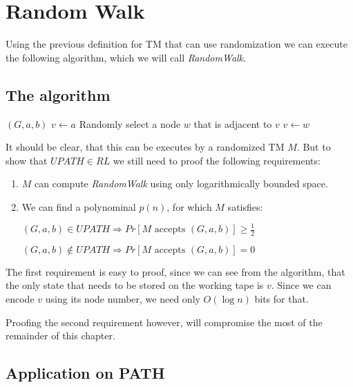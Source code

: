 \chapter{Random Walk}\label{random-walk}

Using the previous definition for TM that can use randomization we can
execute the following algorithm, which we will call \emph{RandomWalk}.

\section{The algorithm}\label{the-algorithm}

\renewcommand{\algorithmicrequire}{\textbf{Input:}}
\renewcommand{\algorithmicensure}{\textbf{Output:}}

\begin{algorithmic}
\Require $(G, a, b)$
\State $v \gets a$
    \State Randomly select a node $w$ that is adjacent to $v$
    \State $v \gets w$
    \EndIf
\EndFor
{}
\end{algorithmic}

It should be clear, that this can be executes by a randomized TM $M$.
But to show that $UPATH \in RL$ we still need to proof the following
requirements:

\begin{enumerate}
\def\labelenumi{\arabic{enumi}.}
\item
  $M$ can compute \emph{RandomWalk} using only logarithmically bounded
  space.
\item
  We can find a polynominal $p(n)$, for which $M$ satisfies:

  $(G, a, b) \in UPATH \Rightarrow Pr[M \text{ accepts } (G, a, b)] \geq \frac{1}{2}$

  $(G, a, b) \not \in UPATH \Rightarrow Pr[M \text{ accepts } (G, a, b)] = 0$
\end{enumerate}

The first requirement is easy to proof, since we can see from the
algorithm, that the only state that needs to be stored on the working
tape is $v$. Since we can encode $v$ using its node number, we need only
$O(\log n)$ bits for that.

Proofing the second requirement however, will compromise the most of the
remainder of this chapter.

\section{Application on PATH}\label{application-on-path}

